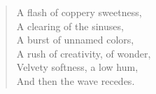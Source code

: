 \begin{verse}
    A flash of coppery sweetness,\\
    A clearing of the sinuses,\\
    A burst of unnamed colors,\\
    A rush of creativity, of wonder,\\
    Velvety softness, a low hum,\\
    And then the wave recedes.
\end{verse}
